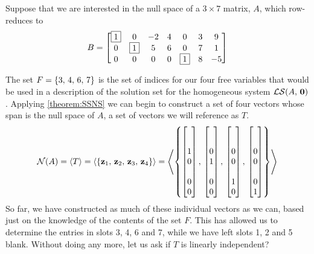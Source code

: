 \documentclass{ximera}
\begin{document}
\begin{example}%
  Suppose that we are interested in the null space of a $3\times 7$
  matrix, $A$, which row-reduces to
  \[
    B=
    \begin{bmatrix}
      \fbox{1} & 0 & -2 & 4 & 0 & 3 & 9\\
      0 & \fbox{1} & 5 & 6 & 0 & 7 & 1\\
      0 & 0 & 0 & 0 & \fbox{1} & 8 & -5
    \end{bmatrix}
  \]

  The set $F=\left\{3,\,4,\,6,\,7\right\}$ is the set of indices for our four
  free variables that would be used in a description of the solution
  set for the homogeneous system $\mathcal{LS}\!\left(A,\,\mathbf{0}\right)$.  Applying
  \ref{theorem:SSNS} we can begin to construct a set of four vectors
  whose span is the null space of $A$, a set of vectors we will
  reference as $T$.
  \[
    \mathcal{N}\!\left(A\right)=\left\langle T\right\rangle=\left\langle\left\{\mathbf{z}_1,\,\mathbf{z}_2,\,\mathbf{z}_3,\,\mathbf{z}_4\right\}\right\rangle=\left\langle\left\{
        \begin{bmatrix} \\ \\1\\0\\ \\0\\0\end{bmatrix},\,
        \begin{bmatrix} \\ \\0\\1\\ \\0\\0\end{bmatrix},\,
        \begin{bmatrix} \\ \\0\\0\\ \\1\\0\end{bmatrix},\,
        \begin{bmatrix} \\ \\0\\0\\ \\0\\1\end{bmatrix}
      \right\}\right\rangle
  \]
  So far, we have constructed as much of these individual vectors as
  we can, based just on the knowledge of the contents of the set $F$.
  This has allowed us to determine the entries in slots 3, 4, 6 and 7,
  while we have left slots 1, 2 and 5 blank.  Without doing any more,
  let us ask if $T$ is linearly independent?


\end{example}
\end{document}
